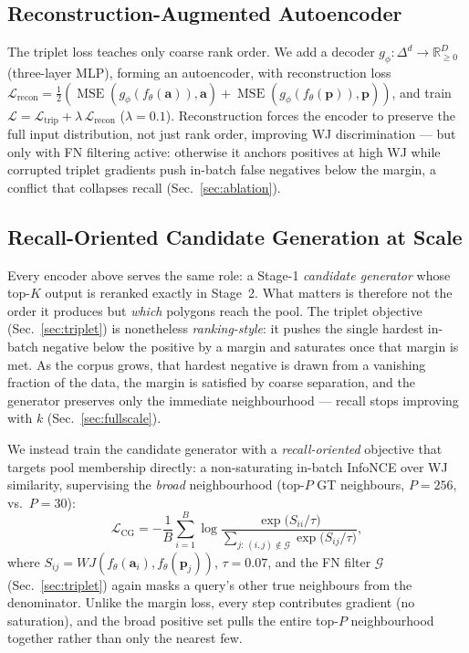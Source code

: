 \documentclass[sigconf]{acmart}
\begin{document}
\subsection{Reconstruction-Augmented Autoencoder}
\label{sec:ae}

The triplet loss teaches only coarse rank order. We add a decoder
$g_\phi: \Delta^d \to \mathbb{R}^D_{\geq 0}$ (three-layer MLP), forming an
autoencoder, with reconstruction loss
$\mathcal{L}_{\text{recon}} = \tfrac{1}{2}(
  \operatorname{MSE}(g_\phi(f_\theta(\mathbf{a})), \mathbf{a}) +
  \operatorname{MSE}(g_\phi(f_\theta(\mathbf{p})), \mathbf{p}))$,
and train $\mathcal{L} = \mathcal{L}_{\text{trip}} +
\lambda\,\mathcal{L}_{\text{recon}}$ ($\lambda{=}0.1$).
Reconstruction forces the encoder to preserve the full input distribution, not
just rank order, improving WJ discrimination --- but only with FN filtering
active: otherwise it anchors positives at high WJ while corrupted triplet
gradients push in-batch false negatives below the margin, a conflict that
collapses recall (Sec.~\ref{sec:ablation}).

\subsection{Recall-Oriented Candidate Generation at Scale}
\label{sec:filter}

Every encoder above serves the same role: a Stage-1 \emph{candidate generator}
whose top-$K$ output is reranked exactly in Stage~2. What matters is therefore not
the order it produces but \emph{which} polygons reach the pool. The triplet
objective (Sec.~\ref{sec:triplet}) is nonetheless \emph{ranking-style}: it pushes
the single hardest in-batch negative below the positive by a margin and saturates
once that margin is met. As the corpus grows, that hardest negative is drawn from
a vanishing fraction of the data, the margin is satisfied by coarse separation,
and the generator preserves only the immediate neighbourhood --- recall stops
improving with $k$ (Sec.~\ref{sec:fullscale}).

We instead train the candidate generator with a \emph{recall-oriented} objective
that targets pool membership directly: a non-saturating in-batch InfoNCE over WJ
similarity, supervising the \emph{broad} neighbourhood (top-$P$ GT neighbours,
$P{=}256$, vs.\ $P{=}30$):
\begin{equation}
  \mathcal{L}_{\text{CG}} = -\frac{1}{B}\sum_{i=1}^{B}
    \log \frac{\exp\!\bigl(S_{ii}/\tau\bigr)}
              {\sum_{j:\,(i,j)\notin\mathcal{G}} \exp\!\bigl(S_{ij}/\tau\bigr)},
  \label{eq:filter}
\end{equation}
where $S_{ij}=WJ(f_\theta(\mathbf{a}_i),f_\theta(\mathbf{p}_j))$, $\tau{=}0.07$,
and the FN filter $\mathcal{G}$ (Sec.~\ref{sec:triplet}) again masks a query's
other true neighbours from the denominator. Unlike the margin loss, every step
contributes gradient (no saturation), and the broad positive set pulls the entire
top-$P$ neighbourhood together rather than only the nearest few.
\end{document}

